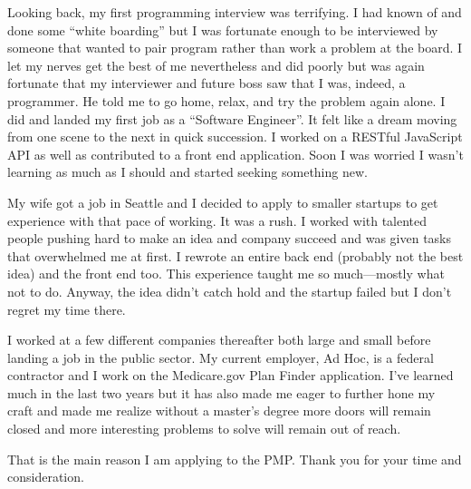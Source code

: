 \documentclass[12pt]{article}
\begin{document}
Looking back, my first programming interview was terrifying. I had known of and done some ``white boarding'' but I was fortunate enough to be interviewed by someone that wanted to pair program rather than work a problem at the board. I let my nerves get the best of me nevertheless and did poorly but was again fortunate that my interviewer and future boss saw that I was, indeed, a programmer. He told me to go home, relax, and try the problem again alone. I did and landed my first job as a ``Software Engineer''. It felt like a dream moving from one scene to the next in quick succession. I worked on a RESTful JavaScript API as well as contributed to a front end application. Soon I was worried I wasn't learning as much as I should and started seeking something new.

My wife got a job in Seattle and I decided to apply to smaller startups to get experience with that pace of working. It was a rush. I worked with talented people pushing hard to make an idea and company succeed and was given tasks that overwhelmed me at first. I rewrote an entire back end (probably not the best idea) and the front end too. This experience taught me so much---mostly what not to do. Anyway, the idea didn't catch hold and the startup failed but I don't regret my time there.

I worked at a few different companies thereafter both large and small before landing a job in the public sector. My current employer, Ad Hoc, is a federal contractor and I work on the Medicare.gov Plan Finder application. I've learned much in the last two years but it has also made me eager to further hone my craft and made me realize without a master's degree more doors will remain closed and more interesting problems to solve will remain out of reach.

That is the main reason I am applying to the PMP. Thank you for your time and consideration.
\end{document}
